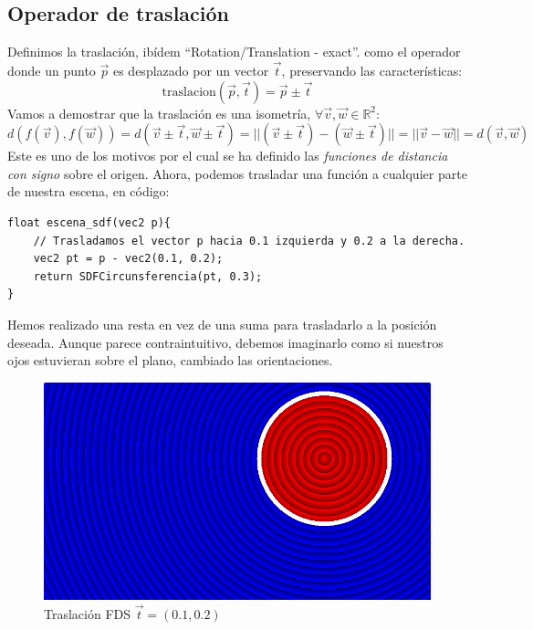 \subsection{Operador de traslación}
Definimos la traslación, ibídem \enquote{Rotation/Translation - exact}. como el operador donde un punto \(\Vec{p}\) es desplazado por un vector \(\Vec{t}\), preservando las características:
\[\text{traslacion}(\Vec{p},\Vec{t})=\Vec{p}\pm\Vec{t}\]
Vamos a demostrar que la traslación es una isometría, \(\forall \Vec{v},\Vec{w}\in\mathbb{R}^2\):
\[d(f(\Vec{v}), f(\Vec{w}))=d(\Vec{v}\pm\Vec{t}, \Vec{w}\pm\Vec{t})=\vert\vert (\Vec{v}\pm\Vec{t})-(\Vec{w}\pm\Vec{t})\vert\vert=\vert\vert \Vec{v}-\Vec{w}\vert\vert=d(\Vec{v}, \Vec{w})\]
Este es uno de los motivos por el cual se ha definido las \textit{funciones de distancia con signo} sobre el origen. Ahora, podemos trasladar una función a cualquier parte de nuestra escena, en código:
\newpage
\begin{lstlisting}
float escena_sdf(vec2 p){
    // Trasladamos el vector p hacia 0.1 izquierda y 0.2 a la derecha.
    vec2 pt = p - vec2(0.1, 0.2);
    return SDFCircunsferencia(pt, 0.3);
}
\end{lstlisting}

Hemos realizado una resta en vez de una suma para trasladarlo a la posición deseada. Aunque parece contraintuitivo, debemos imaginarlo como si nuestros ojos estuvieran sobre el plano, cambiado las orientaciones.

\begin{figure}[H]
  \centering
  \captionsetup{justification=centering}%
  \includegraphics[width=1.0\textwidth]{secciones/imagenes/sdf/2d/sdf_traslacion.png}
  \caption{Traslación FDS \(\Vec{t}=(0.1, 0.2)\)}
  \label{fig:traslacion}
\end{figure}

